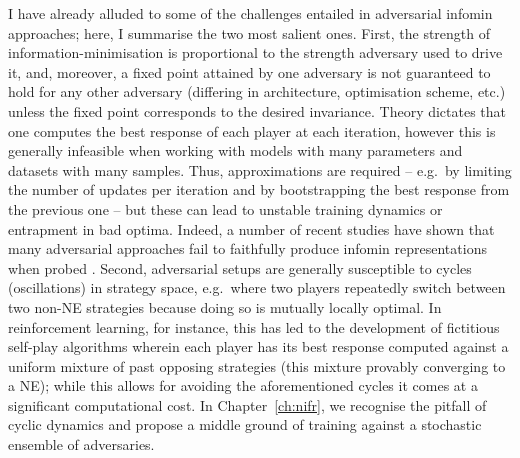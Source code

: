 I have already alluded to some of the challenges entailed in adversarial infomin
approaches; here, I summarise the two most salient ones.
%
First, the strength of information-minimisation is proportional to the strength adversary used to
drive it, and, moreover, a fixed point attained by one adversary is not guaranteed to hold for any
other adversary (differing in architecture, optimisation scheme, etc.) unless the fixed point
corresponds to the desired invariance. 
%
%
Theory dictates that one computes the best response of each player at each iteration, however this
is generally infeasible when working with models with many parameters and datasets with many
samples. 
%
Thus, approximations are required -- e.g.\ by limiting the number of updates per iteration and by
bootstrapping the best response from the previous one -- but these can lead to unstable training
dynamics or entrapment in bad optima. 
%
Indeed, a number of recent studies have shown that many adversarial approaches fail to faithfully
produce infomin representations when probed \citep{moyer2018invariant, feng2019learning,
balunovic2021fair}.
%
%
Second, adversarial setups are generally susceptible to cycles (oscillations) in strategy space,
e.g.\ where two players repeatedly switch between two non-NE strategies because doing so is
mutually locally optimal. 
%
In reinforcement learning, for instance, this has led to the development of fictitious self-play
algorithms \citep{brown1951iterative, heinrich2015fictitious, vinyals2019grandmaster} wherein each
player has its best response computed against a uniform mixture of past opposing strategies (this
mixture provably converging to a NE); while this allows for avoiding the aforementioned cycles it
comes at a significant computational cost.
%
In Chapter~\ref{ch:nifr}, we recognise the pitfall of cyclic dynamics and propose a middle ground
of training against a stochastic ensemble of adversaries.
% 





